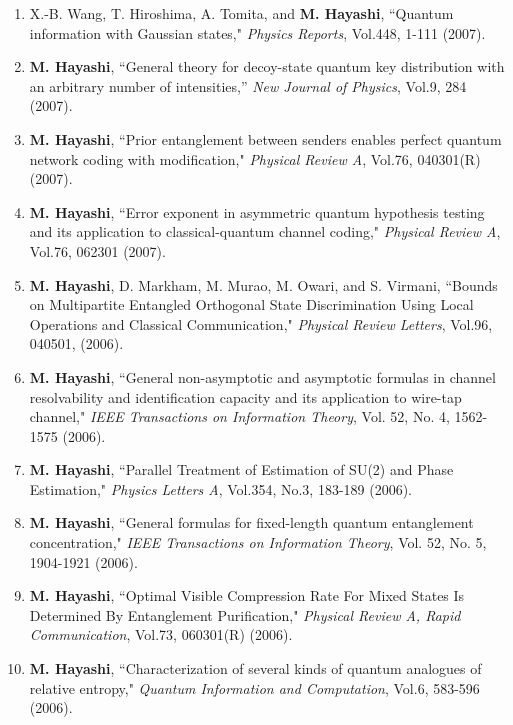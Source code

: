 \documentclass[a4paper,12pt,oneside]{article}
\begin{document}
\begin{enumerate}
\item
X.-B. Wang, T. Hiroshima, A. Tomita, and \textbf{M. Hayashi}, ``Quantum information with Gaussian states," 
{\em Physics Reports}, Vol.448, 1-111 (2007).

\item
\textbf{M. Hayashi}, ``General theory for decoy-state quantum key distribution with an arbitrary number of intensities,'' 
{\em New Journal of Physics}, Vol.9, 284 (2007).

\item
\textbf{M. Hayashi}, ``Prior entanglement between senders enables perfect quantum network coding with modification," 
{\em Physical Review A}, Vol.76, 040301(R) (2007).

\item
\textbf{M. Hayashi}, ``Error exponent in asymmetric quantum hypothesis testing and its application to classical-quantum channel coding,"
{\em Physical Review A}, Vol.76, 062301 (2007).

\item 
\textbf{M. Hayashi}, D. Markham, M. Murao, M. Owari, and S. Virmani, 
``Bounds on Multipartite Entangled Orthogonal State Discrimination Using Local Operations and Classical Communication," 
{\em Physical Review Letters}, Vol.96, 040501, (2006).

\item
\textbf{M. Hayashi}, ``General non-asymptotic and asymptotic formulas in channel resolvability and identification capacity and its application to wire-tap channel," 
{\em IEEE Transactions on Information Theory}, Vol. 52, No. 4, 1562-1575 (2006).

\item
\textbf{M. Hayashi}, ``Parallel Treatment of Estimation of SU(2) and Phase Estimation," 
{\em Physics Letters A}, Vol.354, No.3, 183-189 (2006).

\item
\textbf{M. Hayashi}, ``General formulas for fixed-length quantum entanglement concentration," 
{\em IEEE Transactions on Information Theory}, Vol. 52, No. 5, 1904-1921 (2006).

\item
\textbf{M. Hayashi}, ``Optimal Visible Compression Rate For Mixed States Is Determined By Entanglement Purification," 
{\em Physical Review A, Rapid Communication}, Vol.73, 060301(R) (2006). 

\item
\textbf{M. Hayashi}, ``Characterization of several kinds of quantum analogues of relative entropy," 
{\em Quantum Information and Computation}, Vol.6, 583-596 (2006).


\end{enumerate}
\end{document}
